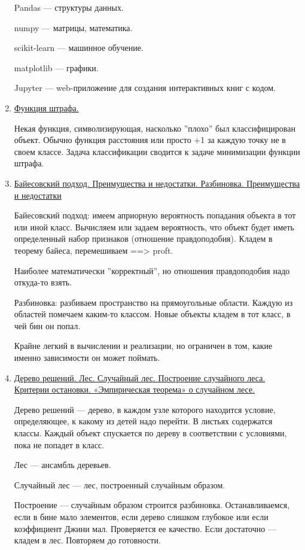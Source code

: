 \documentclass{proc}
\begin{document}
\begin{enumerate}
		Pandas --- структуры данных.
		
		numpy --- матрицы, математика.
		
		scikit-learn --- машинное обучение.
		
		matplotlib --- графики.
		
		Jupyter --- web-приложение для создания интерактивных книг с кодом.
		
		\item \uline{Функция штрафа.}
		
		Некая функция, символизирующая, насколько ''плохо'' был классифицирован объект. Обычно функция расстояния или просто +1 за каждую точку не в своем классе. Задача классификации сводится к задаче минимизации функции штрафа.
		
		\item \uline{Байесовский подход. Преимущества и недостатки. Разбиновка. Преимущества и недостатки}
		
		Байесовский подход: имеем априорную вероятность попадания объекта в тот или иной класс. Вычисляем или задаем вероятность, что объект будет иметь определенный набор признаков (отношение правдоподобия). Кладем в теорему байеса, перемешиваем ==> proft.
		
		Наиболее математически ''корректный'', но отношения правдоподобия надо откуда-то взять.
		
		Разбиновка: разбиваем пространство на прямоугольные области. Каждую из областей помечаем каким-то классом. Новые объекты кладем в тот класс, в чей бин он попал.
		
		Крайне легкий в вычислении и реализации, но ограничен в том, какие именно зависимости он может поймать.
		
		\item \uline{Дерево решений. Лес. Случайный лес. Построение случайного леса. Критерии остановки. «Эмпирическая теорема» о случайном лесе.}
		
		Дерево решений --- дерево, в каждом узле которого находится условие, определяющее, к какому из детей надо перейти. В листьях содержатся классы. Каждый объект спускается по дереву в соответствии с условиями, пока не попадет в класс.
		
		Лес --- ансамбль деревьев.
		
		Случайный лес --- лес, построенный случайным образом.
		
		Построение --- случайным образом строится разбиновка. Останавливаемся, если в бине мало элементов, если дерево слишком глубокое или если коэффициент Джини мал. Проверяется ее качество. Если достаточно --- кладем в лес. Повторяем до готовности.
		

\end{enumerate}
\end{document}
